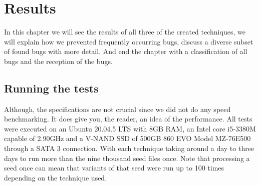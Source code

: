 \chapter{Results}
\label{cha:res}
\label{res:Intro}
In this chapter we will see the results of all three of the created techniques, we will explain how we prevented frequently occurring bugs, discuss a diverse subset of found bugs with more detail. And end the chapter with a classification of all bugs and the reception of the bugs.


\section{Running the tests}
\label{res:RunningTests}
\label{res:Specs}
Although, the specifications are not crucial since we did not do any speed benchmarking. It does give you, the reader, an idea of the performance. All tests were executed on an Ubuntu 20.04.5 LTS with 8GB RAM, an Intel core i5-3380M capable of 2.90GHz and a V-NAND SSD of 500GB 860 EVO Model MZ-76E500 through a SATA 3 connection. With each technique taking around a day to three days to run more than the nine thousand seed files once. Note that processing a seed once can mean that variants of that seed were run up to 100 times depending on the technique used.


